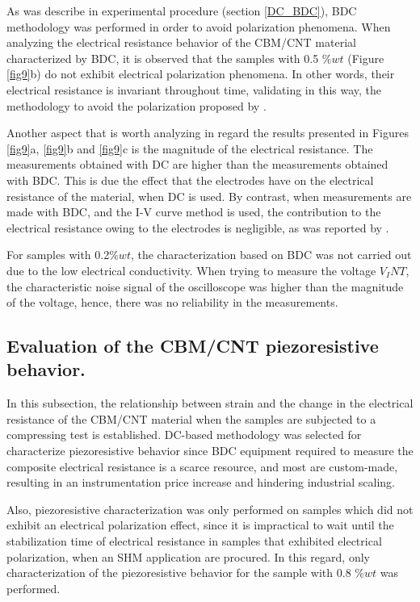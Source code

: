 \documentclass[twocolumn]{bmcart}%
\begin{document}
As was describe in experimental procedure (section \ref{DC_BDC}), BDC methodology was performed in order to avoid polarization phenomena. When analyzing the electrical resistance behavior of the CBM/CNT material characterized by BDC, it is observed that the samples with 0.5 $\%wt$ (Figure \ref{fig9}b) do not exhibit electrical polarization phenomena. In other words, their electrical resistance is invariant throughout time, validating in this way, the methodology  to avoid the polarization proposed by  \citet{Downey2017a, DAlessandro2017}.

Another aspect that is worth analyzing in regard the results presented in Figures \ref{fig9}a, \ref{fig9}b and \ref{fig9}c is the magnitude of the electrical resistance. The measurements obtained with DC are higher than the measurements obtained with BDC. This is due the effect that the electrodes have on the electrical resistance of the material, when DC is used. By contrast, when measurements are made with BDC, and the I-V curve method is used, the contribution to the electrical resistance owing to the electrodes is negligible, as was reported by  \citet{Konsta-Gdoutos2014}.

For samples with 0.2$\%wt$, the characterization based on BDC was not carried out due to the low electrical conductivity. When trying to measure the voltage $V_INT$, the characteristic noise signal of the oscilloscope was higher than the magnitude of the voltage, hence, there was no reliability in the measurements. 

\subsection{Evaluation of the CBM/CNT piezoresistive behavior.}

In this subsection, the relationship between strain and the change in the electrical resistance of the CBM/CNT material when the samples are subjected to a compressing test is established. DC-based methodology  was selected for characterize piezoresistive behavior since BDC equipment required to measure the composite electrical resistance is a scarce resource, and most are custom-made, resulting in an instrumentation price increase and hindering industrial scaling.

Also, piezoresistive characterization was only performed on samples which did not exhibit an electrical polarization effect, since it is impractical to wait until the stabilization time of electrical resistance in samples that exhibited electrical polarization, when an SHM application are procured. In this regard, only characterization of the piezoresistive behavior for the sample with 0.8 $\%wt$ was performed.
\end{document}
